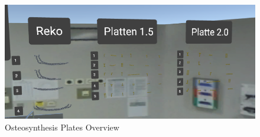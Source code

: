 \begin{figure}[ht!]
    \centering
    \includegraphics[width=\linewidth]{images/implementation/features/procedures/metal_plates_1.png}
    \caption{\label{fig::FeatureMetalPlate} Osteosynthesis Plates Overview}
\end{figure}

